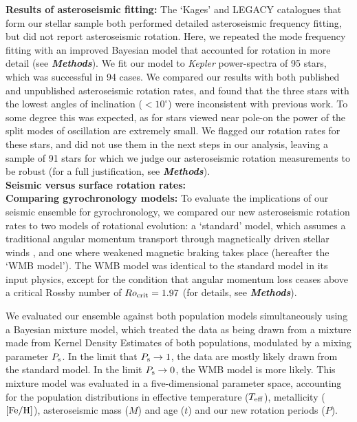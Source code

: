 \documentclass[12pt]{article}
\newcommand{\feh}{\mbox{$\rm{[Fe/H]}$}\xspace}
\newcommand{\kepler}{\emph{Kepler}\xspace}
\begin{document}
\textbf{Results of asteroseismic fitting:} The `Kages' and LEGACY catalogues that form our stellar sample both performed detailed asteroseismic frequency fitting, but did not report asteroseismic rotation. Here, we repeated the mode frequency fitting with an improved Bayesian model that accounted for rotation in more detail (see \textbf{\textit{Methods}}). We fit our model to \kepler power-spectra of 95 stars, which was successful in 94 cases. We compared our results with both published and unpublished asteroseismic rotation rates, and found that the three stars with the lowest angles of inclination ($< 10^\circ$) were inconsistent with previous work. To some degree this was expected, as  for stars viewed near pole-on the power of the split modes of oscillation are extremely small. We flagged our rotation rates for these stars, and did not use them in the next steps in our analysis, leaving a sample of 91 stars for which we judge our asteroseismic rotation measurements to be robust (for a full justification, see \textit{\textbf{Methods}}).\\


\textbf{Seismic versus surface rotation rates:}\\


\textbf{Comparing gyrochronology models:} To evaluate the implications of our seismic ensemble for gyrochronology, we compared our new asteroseismic rotation rates to two models of rotational evolution: a `standard' model, which assumes a traditional angular momentum transport through magnetically driven stellar winds \cite{skumanich1972, kawaler1988}, and one where weakened magnetic braking takes place (hereafter the `WMB model'). The WMB model was identical to the standard model in its input physics, except for the condition that angular momentum loss ceases above a critical Rossby number of $Ro_{\rm crit} = 1.97$ (for details, see \textbf{\textit{Methods}}).

We evaluated our ensemble against both population models simultaneously using a Bayesian mixture model, which treated the data as being drawn from a mixture made from Kernel Density Estimates of both populations, modulated by a mixing parameter $P_{\rm s}$. In the limit that $P_{\rm s} \rightarrow 1$, the data are mostly likely drawn from the standard model. In the limit $P_{\rm s} \rightarrow 0$, the WMB model is more likely. This mixture model was evaluated in a five-dimensional parameter space, accounting for the population distributions in effective temperature ($T_{\rm eff}$), metallicity (\feh), asteroseismic mass ($M$) and age ($t$) and our new rotation periods ($P$).
\end{document}
